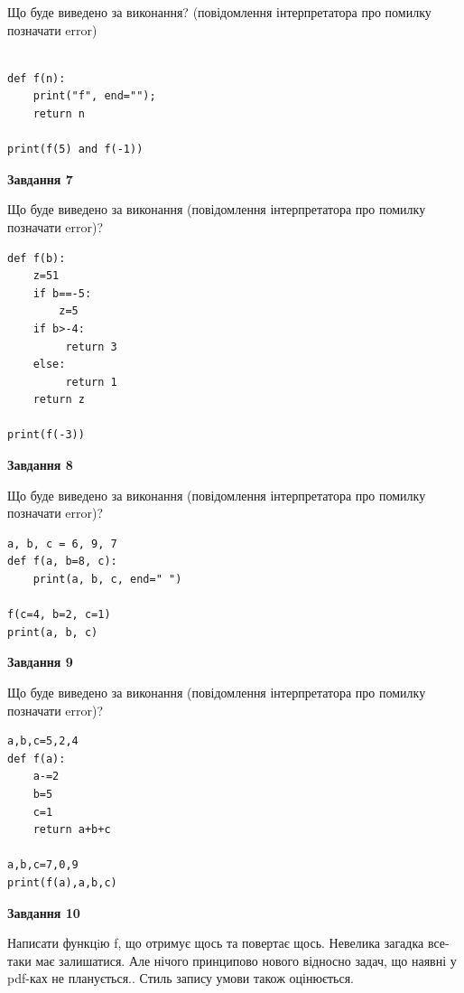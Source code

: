\documentclass[12pt, ukrainian]{article}
\begin{document}
{\begin {large}
Що буде виведено за виконання? (повідомлення інтерпретатора про помилку позначати error)\par
\begin{verbatim}

def f(n):
    print("f", end="");
    return n

print(f(5) and f(-1))
\end{verbatim}

{\begin {center}\textbf{Завдання 7}\end {center}}

Що буде виведено за виконання (повідомлення інтерпретатора про помилку позначати error)?\par
\begin{verbatim}
def f(b):
    z=51
    if b==-5: 
        z=5
    if b>-4:
         return 3
    else:
         return 1
    return z

print(f(-3))
\end{verbatim}

{\begin {center}\textbf{Завдання 8}\end {center}}

Що буде виведено за виконання (повідомлення інтерпретатора про помилку позначати error)?\par
\begin{verbatim}
a, b, c = 6, 9, 7
def f(a, b=8, c):
    print(a, b, c, end=" ")

f(c=4, b=2, c=1)
print(a, b, c)
\end{verbatim}

{\begin {center}\textbf{Завдання 9}\end {center}}

Що буде виведено за виконання (повідомлення інтерпретатора про помилку позначати error)?\par
\begin{verbatim}
a,b,c=5,2,4
def f(a):
    a-=2
    b=5
    c=1
    return a+b+c

a,b,c=7,0,9
print(f(a),a,b,c)
\end{verbatim}

{\begin {center}\textbf{Завдання 10}\end {center}}


Написати функцiю f, що отримує щось та повертає щось. Невелика загадка все-таки має залишатися. Але нічого принципово нового відносно задач, що наявні у pdf-ках не планується.. Стиль запису умови також оцінюється.\par
\end {large}}
\newpage
\end{document}
